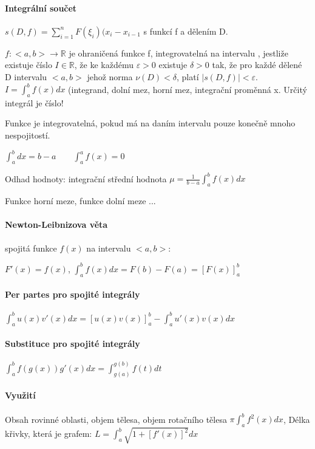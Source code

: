 \documentclass[a4paper, 11pt]{report}
\begin{document}
\paragraph{Integrální součet} $s(D,f) = \sum\limits_{i=1}^n F(\xi_i) (x_i - x_{i-1}$ s funkcí f a dělením D.

$f: <a,b> \to \mathbb{R}$ je ohraničená funkce f, integrovatelná na intervalu , jestliže existuje číslo $I \in \mathbb{R}$, že ke každému $\varepsilon > 0$ existuje $\delta > 0$ tak, že pro každé dělené D intervalu $<a,b>$ jehož norma $\nu(D) < \delta$, platí $|s(D,f)| < \varepsilon$.
$I = \int_a^b f(x) dx$ (integrand, dolní mez, horní mez, integrační proměnná x. Určitý integrál je číslo!

Funkce je integrovatelná, pokud má na daním intervalu pouze konečně mnoho nespojitostí.

$\int_a^b dx = b - a \qquad \int_a^a f(x) = 0$

Odhad hodnoty: integrační střední hodnota $\mu = \frac{1}{b-a} \int_a^b f(x) dx$

Funkce horní meze, funkce dolní meze ...

\paragraph{Newton-Leibnizova věta} spojitá funkce $f(x)$ na intervalu $<a, b>$:

$F'(x) = f(x)$, $\int_a^b f(x) dx = F(b) - F(a) = \left[ F(x) \right]_a^b$

\paragraph{Per partes pro spojité integrály}

$\int_a^b u(x) v'(x) dx = [u(x) v(x) ]_a^b - \int_a^b u'(x) v(x) dx$

\paragraph{Substituce pro spojité integrály}

$\int_a^b f(g(x))g'(x) dx = \int_{g(a)}^{g(b)}f(t) dt$

\paragraph{Využití} Obsah rovinné oblasti, objem tělesa, objem rotačního tělesa $\pi \int_a^b f^2(x) dx$, Délka křivky, která je grafem: $L = \int_a^b \sqrt{1+[f'(x)]^2} dx$
\end{document}

